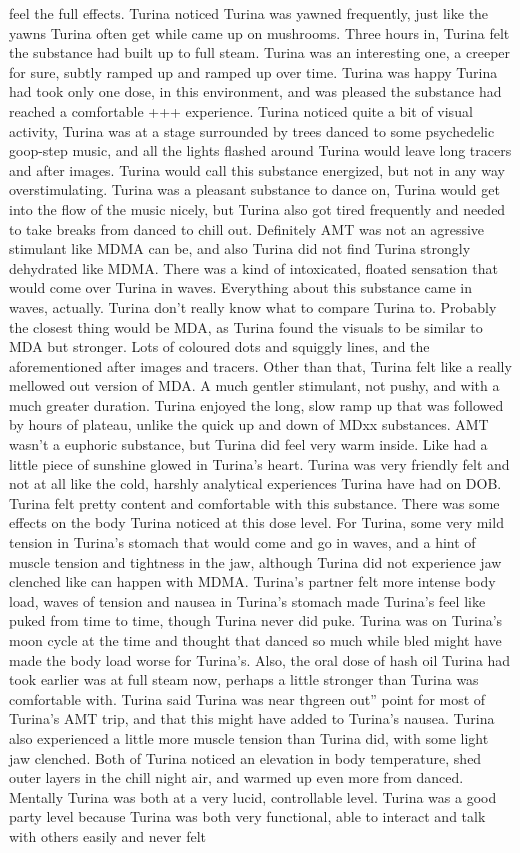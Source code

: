 \documentclass[12pt]{book}
\begin{document}
feel the full effects. Turina noticed Turina was yawned frequently, just like the yawns Turina often get while came up on mushrooms. Three hours in, Turina felt the substance had built up to full steam. Turina was an interesting one, a creeper for sure, subtly ramped up and ramped up over time. Turina was happy Turina had took only one dose, in this environment, and was pleased the substance had reached a comfortable +++ experience. Turina noticed quite a bit of visual activity, Turina was at a stage surrounded by trees danced to some psychedelic goop-step music, and all the lights flashed around Turina would leave long tracers and after images. Turina would call this substance energized, but not in any way overstimulating. Turina was a pleasant substance to dance on, Turina would get into the flow of the music nicely, but Turina also got tired frequently and needed to take breaks from danced to chill out. Definitely AMT was not an agressive stimulant like MDMA can be, and also Turina did not find Turina strongly dehydrated like MDMA. There was a kind of intoxicated, floated sensation that would come over Turina in waves. Everything about this substance came in waves, actually. Turina don't really know what to compare Turina to. Probably the closest thing would be MDA, as Turina found the visuals to be similar to MDA but stronger. Lots of coloured dots and squiggly lines, and the aforementioned after images and tracers. Other than that, Turina felt like a really mellowed out version of MDA. A much gentler stimulant, not pushy, and with a much greater duration. Turina enjoyed the long, slow ramp up that was followed by hours of plateau, unlike the quick up and down of MDxx substances. AMT wasn't a euphoric substance, but Turina did feel very warm inside. Like had a little piece of sunshine glowed in Turina's heart. Turina was very friendly felt and not at all like the cold, harshly analytical experiences Turina have had on DOB. Turina felt pretty content and comfortable with this substance. There was some effects on the body Turina noticed at this dose level. For Turina, some very mild tension in Turina's stomach that would come and go in waves, and a hint of muscle tension and tightness in the jaw, although Turina did not experience jaw clenched like can happen with MDMA. Turina's partner felt more intense body load, waves of tension and nausea in Turina's stomach made Turina's feel like puked from time to time, though Turina never did puke. Turina was on Turina's moon cycle at the time and thought that danced so much while bled might have made the body load worse for Turina's. Also, the oral dose of hash oil Turina had took earlier was at full steam now, perhaps a little stronger than Turina was comfortable with. Turina said Turina was near thgreen out'' point for most of Turina's AMT trip, and that this might have added to Turina's nausea. Turina also experienced a little more muscle tension than Turina did, with some light jaw clenched. Both of Turina noticed an elevation in body temperature, shed outer layers in the chill night air, and warmed up even more from danced. Mentally Turina was both at a very lucid, controllable level. Turina was a good party level because Turina was both very functional, able to interact and talk with others easily and never felt 
\end{document}
